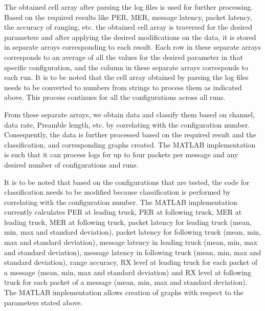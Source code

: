 The obtained cell array after parsing the log files is used for further processing. Based on the required results like PER, MER, message latency, packet latency, the accuracy of ranging, etc. the obtained cell array is traversed for the desired parameters and after applying the desired modifications on the data, it is stored in separate arrays corresponding to each result. Each row in these separate arrays corresponds to an average of all the values for the desired parameter in that specific configuration, and the column in these separate arrays corresponds to each run. It is to be noted that the cell array obtained by parsing the log files needs to be converted to numbers from strings to process them as indicated above. This process continues for all the configurations across all runs.

From these separate arrays, we obtain data and classify them based on channel, data rate, Preamble length, etc. by correlating with the configuration number. Consequently, the data is further processed based on the required result and the classification, and corresponding graphs created. The MATLAB implementation is such that it can process logs for up to four packets per message and any desired number of configurations and runs.

It is to be noted that based on the configurations that are tested, the code for classification needs to be modified because classification is performed by correlating with the configuration number. The MATLAB implementation currently calculates PER at leading truck, PER at following truck, MER at leading truck, MER at following truck, packet latency for leading truck (mean, min, max and standard deviation), packet latency for following truck (mean, min, max and standard deviation), message latency in leading truck (mean, min, max and standard deviation), message latency in following truck (mean, min, max and standard deviation), range accuracy, RX level at leading truck for each packet of a message (mean, min, max and standard deviation) and RX level at following truck for each packet of a message (mean, min, max and standard deviation). The MATLAB implementation allows creation of graphs with respect to the parameters stated above.